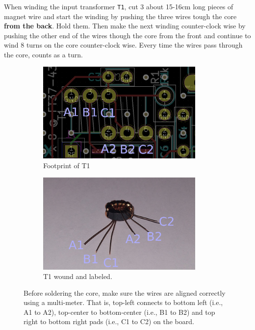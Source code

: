\documentclass[10pt, a4paper,twoside]{scrartcl}
\begin{document}
When winding the input transformer \texttt{T1}, cut 3 about 15-16cm long pieces of magnet wire and start the winding by pushing the three wires tough the core \textbf{from the back}. Hold them. Then make the next winding counter-clock wise by pushing the other end of the wires though the core from the front and continue to wind 8 turns on the core counter-clock wise. Every time the wires pass through the core, counts as a turn. 

\begin{figure}[ht!]
 \begin{subfigure}[t]{0.49\textwidth}
   \centering
   \includegraphics[width=0.9\textwidth]{fig/RX_T1.png}
   \caption{Footprint of T1}
 \end{subfigure}
 \begin{subfigure}[t]{0.49\textwidth}
   \centering
   \includegraphics[width=0.9\textwidth]{fig/RX_T1_IMG_small.png}
   \caption{T1 wound and labeled.}
 \end{subfigure}
 \caption{Before soldering the core, make sure the wires are aligned correctly using a multi-meter. That is, top-left connects to bottom left (i.e., A1 to A2), top-center to bottom-center (i.e., B1 to B2) and top right to bottom right pads (i.e., C1 to C2) on the board.}
\end{figure}
\end{document}
